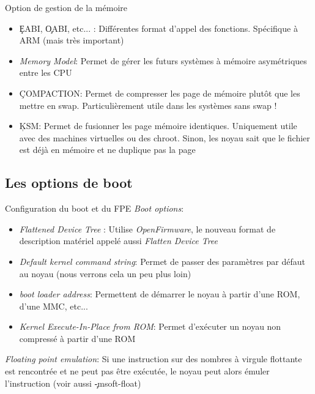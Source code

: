 \begin{frame}[fragile=singleslide]{Option de gestion de la mémoire}
  \begin{itemize}
  \item \c{EABI},  \c{OABI}, etc...  : Différentes format  d'appel des
    fonctions. Spécifique à ARM (mais très important)
  \item  \emph{Memory Model}: Permet  de gérer  les futurs  systèmes à
    mémoire asymétriques entre les CPU
  \item  \c{COMPACTION}:  Permet de  compresser  les  page de  mémoire
    plutôt  que les mettre  en swap.  Particulièrement utile  dans les
    systèmes sans swap !
  \item  \c{KSM}: Permet  de  fusionner les  page mémoire  identiques.
    Uniquement   utile   avec   des   machines   virtuelles   ou   des
    chroot. Sinon, les  noyau sait que le fichier  est déjà en mémoire
    et ne duplique pas la page
  \end{itemize}
\end{frame}

\subsection{Les options de boot}

\begin{frame}[fragile=singleslide]{Configuration du boot et du FPE}
  \emph{Boot options}:
  \begin{itemize}
  \item \emph{Flattened Device  Tree} : Utilise \emph{OpenFirmware}, le
    nouveau format de  description matériel appelé aussi \emph{Flatten
      Device Tree}
  \item  \emph{Default kernel  command string}:  Permet de  passer des
    paramètres  par défaut  au noyau  (nous verrons  cela un  peu plus
    loin)
  \item \emph{boot loader address}:  Permettent de démarrer le noyau à
    partir d'une ROM, d'une MMC, etc...
  \item \emph{Kernel Execute-In-Place  from ROM}: Permet d'exécuter un
    noyau non compressé à partir d'une ROM
  \end{itemize}
  \emph{Floating point emulation}: Si  une instruction sur des nombres
  à virgule flottante est rencontrée  et ne peut pas être exécutée, le
  noyau peut alors émuler l'instruction (voir aussi \c{-msoft-float})
\end{frame}


